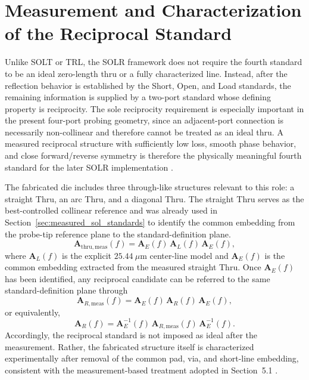 \section{Measurement and Characterization of the Reciprocal Standard}
\label{sec:ch5_reciprocal}

Unlike SOLT or TRL, the SOLR framework does not require the fourth standard to be an ideal zero-length thru or a fully characterized line. Instead, after the reflection behavior is established by the Short, Open, and Load standards, the remaining information is supplied by a two-port standard whose defining property is reciprocity. The sole reciprocity requirement is especially important in the present four-port probing geometry, since an adjacent-port connection is necessarily non-collinear and therefore cannot be treated as an ideal thru. A measured reciprocal structure with sufficiently low loss, smooth phase behavior, and close forward/reverse symmetry is therefore the physically meaningful fourth standard for the later SOLR implementation \cite{solr_patent_2010,Daniel2005USF,shakya2025_apmc}.

The fabricated die includes three through-like structures relevant to this role: a straight Thru, an arc Thru, and a diagonal Thru. The straight Thru serves as the best-controlled collinear reference and was already used in Section~\ref{sec:measured_sol_standards} to identify the common embedding from the probe-tip reference plane to the standard-definition plane.
\begin{equation}
\mathbf{A}_{\mathrm{thru,meas}}(f)=\mathbf{A}_{E}(f)\,\mathbf{A}_{L}(f)\,\mathbf{A}_{E}(f),
\label{eq:recip_thru_embed}
\end{equation}
where \(\mathbf{A}_{L}(f)\) is the explicit \(25.44~\mu\mathrm{m}\) center-line model and \(\mathbf{A}_{E}(f)\) is the common embedding extracted from the measured straight Thru. Once \(\mathbf{A}_{E}(f)\) has been identified, any reciprocal candidate can be referred to the same standard-definition plane through
\begin{equation}
\mathbf{A}_{R,\mathrm{meas}}(f)=\mathbf{A}_{E}(f)\,\mathbf{A}_{R}(f)\,\mathbf{A}_{E}(f),
\label{eq:recip_meas_embed}
\end{equation}
or equivalently,
\begin{equation}
\mathbf{A}_{R}(f)=\mathbf{A}_{E}^{-1}(f)\,\mathbf{A}_{R,\mathrm{meas}}(f)\,\mathbf{A}_{E}^{-1}(f).
\label{eq:recip_deembed}
\end{equation}
Accordingly, the reciprocal standard is not imposed as ideal after the measurement. Rather, the fabricated structure itself is characterized experimentally after removal of the common pad, via, and short-line embedding, consistent with the measurement-based treatment adopted in Section~5.1 \cite{williams_1990_deembed,Fregonese2019tthz}.

